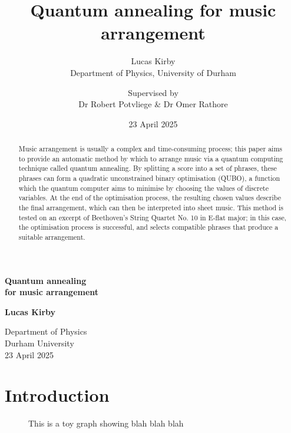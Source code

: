 \documentclass[12pt]{article}
\title{\LARGE Quantum annealing for music arrangement}
\author{\Large Lucas Kirby\\\normalsize Department of Physics, University of Durham \and Supervised by\\\normalsize Dr Robert Potvliege \& Dr Omer Rathore}
\date{\normalsize 23 April 2025}
\begin{document}
\begin{titlepage}
\begin{center}
            
    \Huge
    \textbf{Quantum annealing\\for music arrangement}

    \large
    \textbf{Lucas Kirby}
        
    \vfill

    \begin{abstract}              

    Music arrangement is usually a complex and time-consuming process; this paper aims to provide an automatic method by which to arrange music via a quantum computing technique called quantum annealing. By splitting a score into a set of phrases, these phrases can form a quadratic unconstrained binary optimisation (QUBO), a function which the quantum computer aims to minimise by choosing the values of discrete variables. At the end of the optimisation process, the resulting chosen values describe the final arrangement, which can then be interpreted into sheet music. This method is tested on an excerpt of Beethoven's String Quartet No. 10 in E-flat major; in this case, the optimisation process is successful, and selects compatible phrases that produce a suitable arrangement. \cite{lucas_ising_2014}

    \end{abstract}

    \vfill

    

    \normalsize
    Department of Physics\\
    Durham University\\
    23 April 2025
            
\end{center}
\end{titlepage}


\tableofcontents
\listoffigures
\listoftables

\thispagestyle{empty}
\clearpage

\section{Introduction}

\begin{figure}
    \tiny
    
    \caption[Toy graph]{This is a toy graph showing blah blah blah}
\end{figure}
\end{document}
